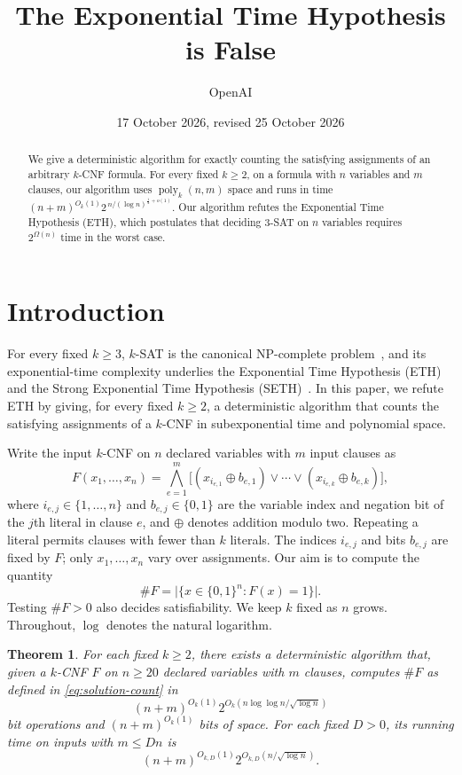 \documentclass[11pt,reqno]{amsart}
\title{The Exponential Time Hypothesis is False}
\author{OpenAI}
\date{17 October 2026, revised 25 October 2026}
\numberwithin{equation}{section}
\newtheorem{theorem}{Theorem}[section]
\theoremstyle{definition}\newtheorem{definition}[theorem]{Definition}
\theoremstyle{remark}\newtheorem{remark}[theorem]{Remark}
\newcommand{\poly}{\operatorname{poly}}
\renewcommand{\le}{\leqslant}
\renewcommand{\ge}{\geqslant}
\begin{document}
\begin{abstract}
We give a deterministic algorithm for exactly counting the satisfying assignments
of an arbitrary $k$-CNF formula.
For every fixed $k\ge2$, on a formula with $n$ variables and $m$ clauses,
our algorithm uses $\poly_k(n,m)$ space and runs in time
$(n+m)^{O_k(1)}2^{\,n/(\log n)^{\frac12+o(1)}}$.
Our algorithm refutes the Exponential Time Hypothesis (ETH), which
postulates that deciding $3$-SAT on $n$ variables requires
$2^{\Omega(n)}$ time in the worst case.
\end{abstract}
\maketitle

\tableofcontents
\vspace{-\baselineskip}

\section{Introduction}
For every fixed $k\ge3$, $k$-SAT is the canonical NP-complete
problem~\cite{Cook71}, and its exponential-time complexity underlies the Exponential Time
Hypothesis (ETH) and the Strong Exponential Time Hypothesis
(SETH)~\cite{IP01,IPZ}.
In this paper, we refute ETH by giving, for every fixed $k\ge2$,
a deterministic algorithm that counts the satisfying assignments
of a $k$-CNF in subexponential time and polynomial space.

Write the input $k$-CNF on $n$ declared variables with $m$ input clauses as
\[
 F(x_1,\ldots,x_n)=\bigwedge_{e=1}^m
 \bigl[(x_{i_{e,1}}\oplus b_{e,1})\vee\cdots\vee
       (x_{i_{e,k}}\oplus b_{e,k})\bigr],
\]
where $i_{e,j}\in\{1,\ldots,n\}$ and $b_{e,j}\in\{0,1\}$ are the
variable index and negation bit of the $j$th literal in clause $e$,
and $\oplus$ denotes addition modulo two. Repeating a literal permits
clauses with fewer than $k$ literals.
The indices $i_{e,j}$ and bits $b_{e,j}$ are fixed by $F$;
only $x_1,\ldots,x_n$ vary over assignments.
Our aim is to compute the quantity
\begin{equation}\label{eq:solution-count}
 \#F=\bigl|\{x\in\{0,1\}^n:F(x)=1\}\bigr|.
\end{equation}
Testing $\#F>0$ also decides satisfiability.
We keep $k$ fixed as $n$ grows.
Throughout, $\log$ denotes the natural logarithm.
\begin{theorem}\label{thm:main}
For each fixed $k\ge2$, there exists a deterministic algorithm that,
given a $k$-CNF $F$ on $n\ge20$ declared variables with $m$ clauses,
computes $\#F$ as defined in \eqref{eq:solution-count} in
\[
 (n+m)^{O_k(1)}2^{O_k(n\log\log n/\sqrt{\log n})}
\]
bit operations and $(n+m)^{O_k(1)}$ bits of space.
For each fixed $D>0$, its running time on inputs with $m\le Dn$ is
\[
 (n+m)^{O_{k,D}(1)}2^{O_{k,D}(n/\sqrt{\log n})}.
\]
\end{theorem}
\end{document}
